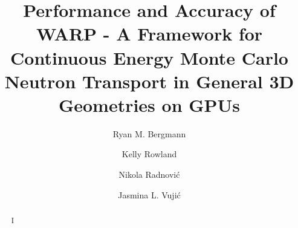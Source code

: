 \documentclass[preprint,12pt]{elsarticle}
\begin{document}
\begin{frontmatter}



\title{Performance and Accuracy of WARP - A Framework for Continuous Energy Monte Carlo Neutron Transport in General 3D Geometries on GPUs}


\author{Ryan M. Bergmann }

\author{Kelly Rowland }

\author{Nikola Radnovi\'c }

\author{Jasmina L. Vuji\'c }


\address{Department of Nuclear Engineering, 
4155 Etcheverry Hall, 
University of California - Berkeley,
Berkeley, CA 94703-1730}

\begin{abstract}

I%


\end{abstract}
\end{frontmatter}
\end{document}
